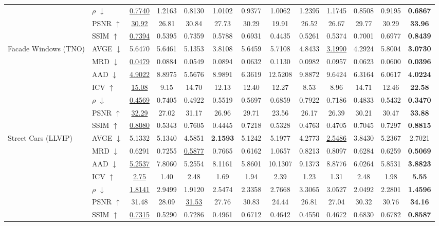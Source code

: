 \begin{table}[t]
{\begin{tabular}{llccccccccccc}
 & $\rho$ $\downarrow$ & \underline{0.7740} & 1.2163 & 0.8130 & 1.0102 & 0.9377 & 1.0062 & 1.2395 & 1.1745 & 0.8508 & 0.9195 & \textbf{0.6867} \\
 & PSNR $\uparrow$ & \underline{30.92} & 26.81 & 30.84 & 27.73 & 30.29 & 19.91 & 26.52 & 26.67 & 29.77 & 30.29 & \textbf{33.96} \\
 & SSIM $\uparrow$ & \underline{0.7394} & 0.5395 & 0.7359 & 0.5788 & 0.6931 & 0.4435 & 0.5261 & 0.5374 & 0.7001 & 0.6977 & \textbf{0.8439} \\
\midrule
\multirow{7}{*}{Facade Windows (TNO)} & AVGE $\downarrow$ & 5.6470 & 5.6461 & 5.1353 & 3.8108 & 5.6459 & 5.7108 & 4.8433 & \underline{3.1990} & 4.2924 & 5.8004 & \textbf{3.0730} \\
 & MRD $\downarrow$ & \underline{0.0479} & 0.0884 & 0.0549 & 0.0894 & 0.0632 & 0.1130 & 0.0982 & 0.0957 & 0.0623 & 0.0600 & \textbf{0.0396} \\
 & AAD $\downarrow$ & \underline{4.9022} & 8.8975 & 5.5676 & 8.9891 & 6.3619 & 12.5208 & 9.8872 & 9.6424 & 6.3164 & 6.0617 & \textbf{4.0224} \\
 & ICV $\uparrow$ & \underline{15.08} & 9.15 & 14.70 & 12.13 & 12.40 & 12.27 & 8.53 & 8.96 & 14.71 & 12.46 & \textbf{22.58} \\
 & $\rho$ $\downarrow$ & \underline{0.4569} & 0.7405 & 0.4922 & 0.5519 & 0.5697 & 0.6859 & 0.7922 & 0.7186 & 0.4833 & 0.5432 & \textbf{0.3470} \\
 & PSNR $\uparrow$ & \underline{32.29} & 27.02 & 31.17 & 26.96 & 29.71 & 23.56 & 26.17 & 26.39 & 30.21 & 30.47 & \textbf{33.88} \\
 & SSIM $\uparrow$ & \underline{0.8080} & 0.5343 & 0.7605 & 0.4445 & 0.7218 & 0.5328 & 0.4763 & 0.4705 & 0.7045 & 0.7297 & \textbf{0.8815} \\
\midrule
\multirow{7}{*}{Street Cars (LLVIP)} & AVGE $\downarrow$ & 5.1332 & 5.1340 & 4.5851 & \textbf{2.1593} & 5.1242 & 5.1977 & 4.2773 & \underline{2.5486} & 3.8430 & 5.2367 & 2.7021 \\
 & MRD $\downarrow$ & 0.6291 & 0.7255 & \underline{0.5877} & 0.7665 & 0.6162 & 1.0657 & 0.8213 & 0.8097 & 0.6284 & 0.6259 & \textbf{0.5069} \\
 & AAD $\downarrow$ & \underline{5.2537} & 7.8060 & 5.2554 & 8.1161 & 5.8601 & 10.1307 & 9.1373 & 8.8776 & 6.0264 & 5.8531 & \textbf{3.8823} \\
 & ICV $\uparrow$ & \underline{2.75} & 1.40 & 2.48 & 1.69 & 1.94 & 2.39 & 1.23 & 1.31 & 2.48 & 1.98 & \textbf{5.55} \\
 & $\rho$ $\downarrow$ & \underline{1.8141} & 2.9499 & 1.9120 & 2.5474 & 2.3358 & 2.7668 & 3.3065 & 3.0527 & 2.0492 & 2.2801 & \textbf{1.4596} \\
 & PSNR $\uparrow$ & 31.48 & 28.09 & \underline{31.53} & 27.76 & 30.83 & 24.44 & 26.81 & 27.04 & 30.32 & 30.76 & \textbf{34.16} \\
 & SSIM $\uparrow$ & \underline{0.7315} & 0.5290 & 0.7286 & 0.4961 & 0.6712 & 0.4642 & 0.4550 & 0.4672 & 0.6830 & 0.6782 & \textbf{0.8587} \\
\bottomrule
\end{tabular}
}
\end{table}